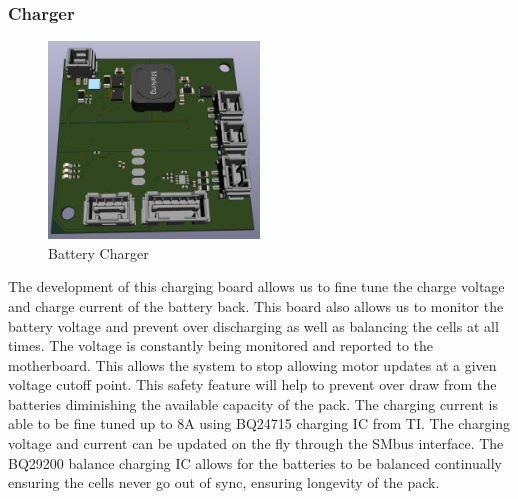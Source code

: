 \subsubsection{Charger}
\begin{figure}[H]
       \centering
       \includegraphics[width=0.5\textwidth]{figures/Charger.png}
       \caption{Battery Charger}
       \label{fig:ChargerPCB}
   \end{figure}
The development of this charging board allows us to fine tune the charge voltage and charge current of the battery back. This board also allows us to monitor the battery voltage and prevent over discharging as well as balancing the cells at all times. The voltage is constantly being monitored and reported to the motherboard. This allows the system to stop allowing motor updates at a given voltage cutoff point. This safety feature will help to prevent over draw from the batteries diminishing the available capacity of the pack. The charging current is able to be fine tuned up to 8A using BQ24715 charging IC from TI. The charging voltage and current can be updated on the fly through the SMbus interface. The BQ29200 balance charging IC allows for the batteries to be balanced continually ensuring the cells never go out of sync, ensuring longevity of the pack.

